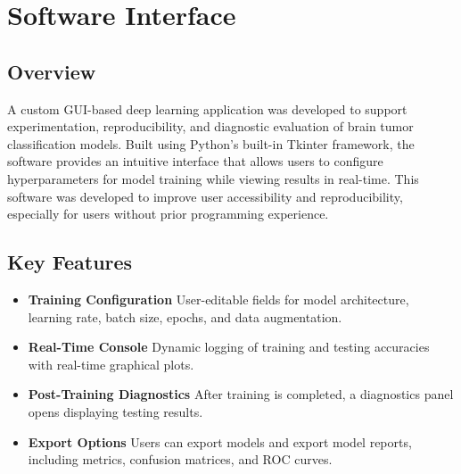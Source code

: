 \documentclass[11pt]{article}
\begin{document}
\section{Software Interface}
\subsection*{Overview}

A custom GUI-based deep learning application was developed to support experimentation, reproducibility, and diagnostic evaluation of brain tumor classification models. Built using Python's built-in Tkinter framework, the software provides an intuitive interface that allows users to configure hyperparameters for model training while viewing results in real-time. This software was developed to improve user accessibility and reproducibility, especially for users without prior programming experience.

\subsection*{Key Features}
\begin{itemize}
\item \textbf{Training Configuration} User-editable fields for model architecture, learning rate, batch size, epochs, and data augmentation.
\item \textbf{Real-Time Console} Dynamic logging of training and testing accuracies with real-time graphical plots.
\item \textbf{Post-Training Diagnostics} After training is completed, a diagnostics panel opens displaying testing results.
\item \textbf{Export Options} Users can export models and export model reports, including metrics, confusion matrices, and ROC curves.
\end{itemize}
\end{document}
